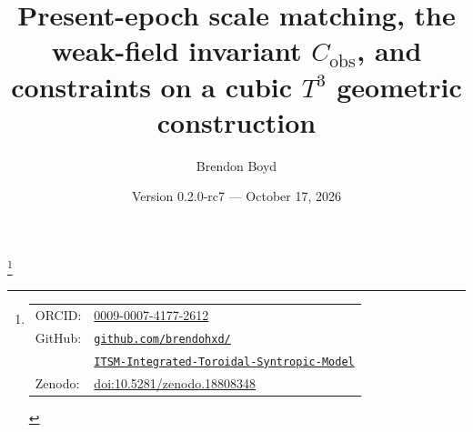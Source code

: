 \documentclass[aps,prd,reprint,superscriptaddress,nofootinbib,floatfix,showkeys]{revtex4-2}
\newcommand{\Tthree}{T^{3}}
\newcommand{\Cobs}{C_{\mathrm{obs}}}
\begin{document}
\title{Present-epoch scale matching, the weak-field invariant
\texorpdfstring{\(\Cobs\)}{C\_obs}, and constraints on a cubic
\texorpdfstring{\(\Tthree\)}{T3} geometric construction}

\author{Brendon Boyd}
\thanks{%
\begin{tabular}{@{}l@{\ }l@{}}
ORCID: & \href{https://orcid.org/0009-0007-4177-2612}{0009-0007-4177-2612} \\
GitHub: & \href{https://github.com/brendohxd/ITSM-Integrated-Toroidal-Syntropic-Model}{\nolinkurl{github.com/brendohxd/}} \\
        & \href{https://github.com/brendohxd/ITSM-Integrated-Toroidal-Syntropic-Model}{\nolinkurl{ITSM-Integrated-Toroidal-Syntropic-Model}} \\
Zenodo: & \href{https://doi.org/10.5281/zenodo.18808348}{doi:10.5281/zenodo.18808348} \\
\end{tabular}%
}

\date{Version 0.2.0-rc7 --- October 17, 2026}
\end{document}
